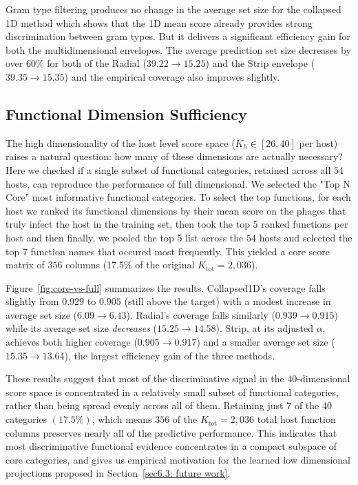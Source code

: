 Gram type filtering produces no change in the average set size for the collapsed 1D method which shows that the 1D mean score
already provides strong discrimination between gram types. But it delivers a significant efficiency gain for both the multidimensional 
envelopes. The average prediction set size decreases by over $60\%$ for both of the Radial ($39.22 \to 15.25$) and the Strip envelope 
($39.35 \to 15.35$) and the empirical coverage also improves slightly.  



\subsection{Functional Dimension Sufficiency}
\label{sec5.3.6:core-set}

The high dimensionality of the host level score space ($K_h \in [26, 40]$ per host) raises a natural question: how many 
of these dimensions are actually necessary? Here we checked if a single subset of functional categories, retained across 
all $54$ hosts, can reproduce the performance of full dimensional. We selected the "Top N Core" most informative 
functional categories. To select the top functions, for each host we ranked its functional dimensions by their mean score on 
the phages that truly infect the host in the training set, then took the top 5 ranked functions per host and then finally, we 
pooled the top 5 list across the $54$ hosts and selected the top 7 function names that occured most frequently. This yielded  
a core score matrix of $356$ columns (17.5\% of the original $K_{\text{tot}} = 2{,}036$). 

Figure~\ref{fig:core-vs-full} summarizes the results. Collapsed1D's coverage
falls slightly from $0.929$ to $0.905$ (still above the target) with a modest increase in average set size ($6.09 \to
6.43$). Radial's coverage falls similarly ($0.939 \to 0.915$) while its average set size \emph{decreases}
($15.25 \to 14.58$). Strip, at its adjusted $\alpha$, achieves both higher coverage ($0.905 \to 0.917$) and a
smaller average set size ($15.35 \to 13.64$), the largest efficiency gain of the three methods.

These results suggest that most of the discriminative signal in the $40$-dimensional score space is concentrated in a relatively small 
subset of functional categories, rather than being spread evenly across all of them. Retaining just 7 of the 40 categories $(17.5\%)$, 
which means $356$ of the $K_{\text{tot}} = 2{,}036$ total host function columns preserves nearly all of the predictive performance. 
This indicates that most discriminative functional evidence concentrates in a compact subspace of core categories, and gives us 
empirical motivation for the learned low dimensional projections proposed in Section~\ref{sec6.3: future work}.

